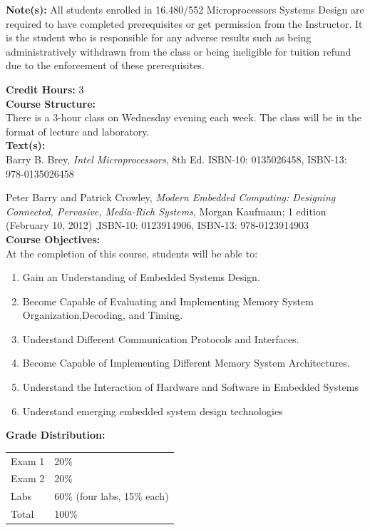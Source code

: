 \documentclass[11pt]{article}
\begin{document}
\textbf {Note(s):} All students enrolled in 16.480/552 Microprocessors Systems Design are required to have completed prerequisites or get permission from the Instructor. It is the student who is responsible for any adverse results such as being administratively withdrawn from the class or being ineligible for tuition refund due to the enforcement of these prerequisites.

\textbf {Credit Hours:} 3 \\

\textbf {\large Course Structure:} \\
There is a 3-hour class on Wednesday evening each week. The class will be in the format of lecture and laboratory.
\\

\textbf {\large Text(s):} \\
Barry B. Brey, {\em Intel Microprocessors}, 8th Ed. ISBN-10: 0135026458, ISBN-13: 978-0135026458

Peter Barry and Patrick Crowley, {\em Modern Embedded Computing: Designing Connected, Pervasive, Media-Rich Systems}, Morgan Kaufmann; 1 edition (February 10, 2012) ,ISBN-10: 0123914906, ISBN-13: 978-0123914903
\\

\textbf {\large Course Objectives:} \\
At the completion of this course, students will be able to:
\begin{enumerate} \itemsep-0.4em
  \item Gain an Understanding of Embedded Systems Design. 
  \item Become Capable of Evaluating and Implementing Memory System Organization,Decoding, and Timing.
\item Understand Different Communication Protocols and Interfaces.
\item Become Capable of Implementing Different Memory System Architectures.
\item Understand the Interaction of Hardware and Software in Embedded Systems
\item Understand emerging embedded system design technologies 
\end{enumerate}

\textbf {\large Grade Distribution:} \\
\hspace*{40mm}
\begin{tabular}{ l l }
Exam 1 & 20\% \\
Exam 2 & 20\% \\
Labs  & 60\% (four labs, 15\% each)\\
Total  & 100\%
\end{tabular} \\
\end{document}

